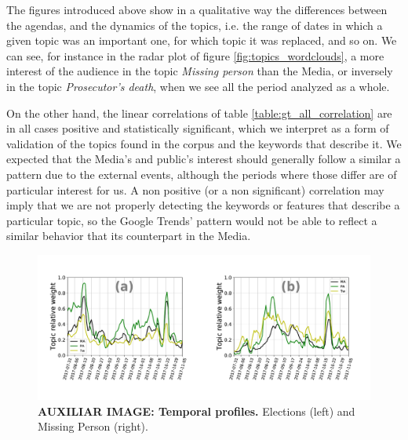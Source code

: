 

\par The figures introduced above show in a qualitative way the differences between the agendas, and the dynamics of the topics, i.e. the range of dates in which a given topic was an important one, for which topic it was replaced, and so on. We can see, for instance in the radar plot of figure \ref{fig:topics_wordclouds}, a more interest of the audience in the topic \emph{Missing person} than the Media, or inversely in the topic \emph{Prosecutor's death}, when we see all the period analyzed as a whole. 
\par On the other hand, the linear correlations of table \ref{table:gt_all_correlation} are in all cases positive and statistically significant, which we interpret as a form of validation of the topics found in the corpus and the keywords that describe it. 
We expected that the Media's and public's interest should generally follow a similar a pattern due to the external events, although the periods where those differ are of particular interest for us. 
A non positive (or a non significant) correlation may imply that we are not properly detecting the keywords or features that describe a particular topic, so the Google Trends' pattern would not be able to reflect a similar behavior that its counterpart in the Media.

\begin{figure}[h]
\centering
\includegraphics[width = \textwidth]{images/Fig2_5.pdf}
\caption{\textbf{AUXILIAR IMAGE: Temporal profiles.}
Elections (left) and Missing Person (right).
}
\end{figure}
